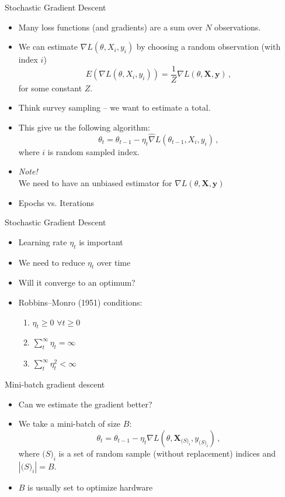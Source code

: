 \documentclass[10pt,handout]{beamer}
\begin{document}
\begin{frame}{Stochastic Gradient Descent}


\begin{itemize}
\item Many loss functions (and gradients) are a sum over $N$ observations.
\item We can estimate $\nabla L(\theta, X_{i}, y_{i})$ by choosing a random observation (with index $i$)
\[
E(\nabla L(\theta, X_{i}, y_{i})) = \frac{1}{Z} \nabla L(\theta, \mathbf{X}, \mathbf{y})\,,
\]
for some constant $Z$.
\item Think survey sampling -- we want to estimate a total.
\item This give us the following algorithm:
\[
\theta_t = \theta_{t-1} - \eta_t \hat{\nabla} L(\theta_{t-1}, X_{i}, y_{i})\,,
\]
where $i$ is random sampled index.
\item \emph{Note!} \\We need to have an unbiased estimator for $\nabla L(\theta, \mathbf{X}, \mathbf{y})$
\item Epochs vs. Iterations
\end{itemize}


\end{frame}


\begin{frame}{Stochastic Gradient Descent}


\begin{itemize}
\item Learning rate $\eta_t$ is important
\item We need to reduce $\eta_t$ over time
\item Will it converge to an optimum?\pause
\item Robbins–Monro (1951) conditions:
\begin{enumerate}
\item $\eta_t \geq 0$ $\forall t \geq 0$
\item $\sum^\infty_t \eta_t = \infty$
\item $\sum^\infty_t \eta_t^2 < \infty$
\end{enumerate}
\end{itemize}

\end{frame}


\begin{frame}{Mini-batch gradient descent}

\begin{itemize}
\item Can we estimate the gradient better?\pause
\item We take a mini-batch of size $B$:
\[
\theta_t = \theta_{t-1} - \eta_t \nabla L(\theta, \mathbf{X}_{\mathcal(S)_i}, y_{\mathcal(S)_i})\,,
\]
where $\mathcal(S)_i$ is a set of random sample (without replacement) indices and $|\mathcal(S)_i| = B$.
\item $B$ is usually set to optimize hardware
\end{itemize}

\end{frame}
\end{document}
